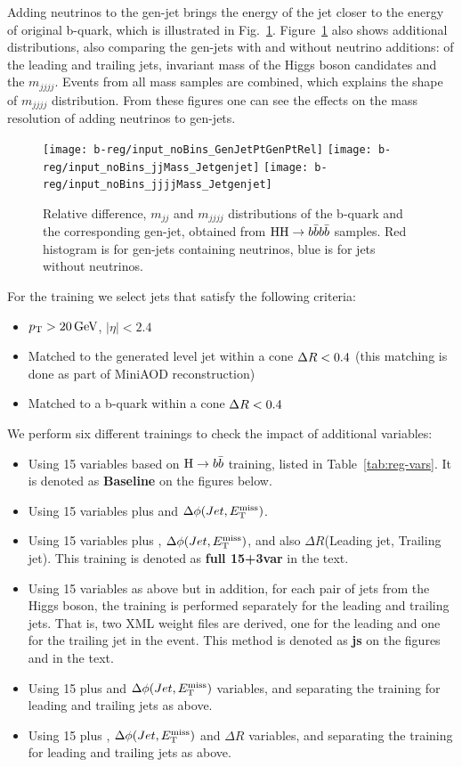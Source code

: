 Adding neutrinos to the gen-jet brings the energy of the jet closer to the energy of original b-quark, which is illustrated in Fig.~\ref{fig:b-reg-quark}.  
Figure~\ref{fig:b-reg-quark} also shows additional distributions, also comparing the gen-jets with and without
neutrino additions: \PT of the leading and trailing jets, invariant mass of the Higgs boson candidates and the $m_{jjjj}$. 
Events from all mass samples are combined, which explains the shape of $m_{jjjj}$ distribution. 
From these figures one can see the effects on the mass resolution of adding neutrinos to gen-jets.

\begin{figure}[h]
  \centering
  \texttt{[image: b-reg/input\_noBins\_GenJetPtGenPtRel]}\hfil
  \texttt{[image: b-reg/input\_noBins\_jjMass\_Jetgenjet]}\hfil
  \texttt{[image: b-reg/input\_noBins\_jjjjMass\_Jetgenjet]}\hfil

  \caption{Relative \PT difference, $m_{jj}$ and $m_{jjjj}$ distributions of the b-quark and the
    corresponding gen-jet, obtained from $\mathrm{H}\mathrm{H}\to b\bar{b}b\bar{b}$ samples. Red
    histogram is for gen-jets containing neutrinos, blue is for jets
    without neutrinos.}
  \label{fig:b-reg-quark}
\end{figure}

For the training we select jets that satisfy the following criteria:
\begin{itemize}
\item $p_{\mathrm{T}} > 20\,\text{Ge\hspace{-.08em}V}$, $|\eta| < 2.4$
\item Matched to the generated level jet within a cone $\Delta R<0.4$ (this matching is done as part of MiniAOD reconstruction)
\item Matched to a b-quark within a cone $\Delta R<0.4$
\end{itemize}


We perform six different trainings to check the impact of additional variables:
\begin{itemize}
\item Using 15 variables based on $\mathrm{H}\to b\bar{b}$ training, listed in
  Table~\ref{tab:reg-vars}. It is denoted as \textbf{Baseline} on the
  figures below.
\item Using 15 variables plus \MET and $\Delta\phi(Jet, E_{\mathrm{T}}^{\text{miss}})$.
\item Using 15 variables plus \MET , $\Delta\phi(Jet, E_{\mathrm{T}}^{\text{miss}})$, and also
  $\Delta R$(Leading jet, Trailing jet).  This training is denoted as
  \textbf{full 15+3var} in the text.
\item Using 15 variables as above but in addition, for each pair of
  jets from the Higgs boson, the training is performed separately for
  the leading and trailing jets. That is, two XML weight files are
  derived, one for the leading and one for the trailing jet in the
  event.  This method is denoted as \textbf{js} on the figures and in
  the text.
\item Using 15 plus \MET and $\Delta\phi(Jet, E_{\mathrm{T}}^{\text{miss}})$ variables, and
  separating the training for leading and trailing jets as above.
\item Using 15 plus \MET, $\Delta\phi(Jet, E_{\mathrm{T}}^{\text{miss}})$ and $\Delta R$
  variables, and separating the training for leading and trailing jets
  as above.
\end{itemize}

